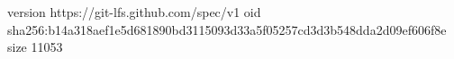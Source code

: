 version https://git-lfs.github.com/spec/v1
oid sha256:b14a318aef1e5d681890bd3115093d33a5f05257cd3d3b548dda2d09ef606f8e
size 11053
